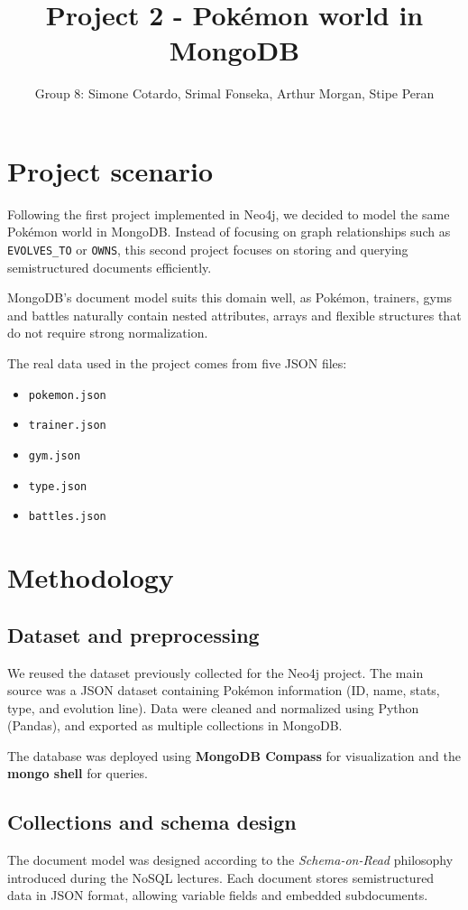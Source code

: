 \documentclass[11pt]{article}
\title{Project 2 - Pokémon world in MongoDB}
\author{Group 8: Simone Cotardo, Srimal Fonseka, Arthur Morgan, Stipe Peran}
\date{}
\begin{document}
    \maketitle
    
    \section{Project scenario}
    \label{sec:proj-scen}
    Following the first project implemented in Neo4j, we decided to model the same Pokémon world in MongoDB. 
    Instead of focusing on graph relationships such as \texttt{EVOLVES\_TO} or \texttt{OWNS}, this second project focuses on storing and querying semistructured documents efficiently.

    MongoDB's document model suits this domain well, as Pokémon, trainers, gyms and battles naturally contain nested attributes, arrays and flexible structures that do not require strong normalization.

    The real data used in the project comes from five JSON files:
    \begin{itemize}
        \item \texttt{pokemon.json}
        \item \texttt{trainer.json}
        \item \texttt{gym.json}
        \item \texttt{type.json}
        \item \texttt{battles.json}
    \end{itemize}
    
    \section{Methodology}
    \subsection{Dataset and preprocessing}
    We reused the dataset previously collected for the Neo4j project. The main source was a JSON dataset containing Pokémon information (ID, name, stats, type, and evolution line).  
    Data were cleaned and normalized using Python (Pandas), and exported as multiple collections in MongoDB.

    The database was deployed using \textbf{MongoDB Compass} for visualization and the \textbf{mongo shell} for queries.

    \subsection{Collections and schema design}
    The document model was designed according to the \emph{Schema-on-Read} philosophy introduced during the NoSQL lectures. Each document stores semistructured data in JSON format, allowing variable fields and embedded subdocuments.
\end{document}
